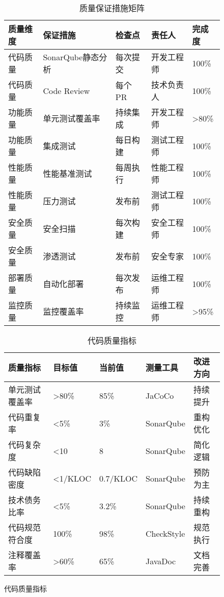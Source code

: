 \documentclass[a4paper,12pt]{article}
\begin{document}
\begin{figure}[H]
\begin{table}[H]
\centering
\caption{质量保证措施矩阵}
\begin{tabular}{|p{2.5cm}|p{3cm}|p{3cm}|p{2.5cm}|p{2cm}|}
\hline
\textbf{质量维度} & \textbf{保证措施} & \textbf{检查点} & \textbf{责任人} & \textbf{完成度} \\
\hline
代码质量 & SonarQube静态分析 & 每次提交 & 开发工程师 & 100\% \\
\hline
代码质量 & Code Review & 每个PR & 技术负责人 & 100\% \\
\hline
功能质量 & 单元测试覆盖率 & 持续集成 & 开发工程师 & >80\% \\
\hline
功能质量 & 集成测试 & 每日构建 & 测试工程师 & 100\% \\
\hline
性能质量 & 性能基准测试 & 每周执行 & 性能工程师 & 100\% \\
\hline
性能质量 & 压力测试 & 发布前 & 测试工程师 & 100\% \\
\hline
安全质量 & 安全扫描 & 每次构建 & 安全工程师 & 100\% \\
\hline
安全质量 & 渗透测试 & 发布前 & 安全专家 & 100\% \\
\hline
部署质量 & 自动化部署 & 每次发布 & 运维工程师 & 100\% \\
\hline
监控质量 & 监控覆盖率 & 持续监控 & 运维工程师 & >95\% \\
\hline
\end{tabular}
\end{table}

\begin{table}[H]
\centering
\caption{代码质量指标}
\begin{tabular}{|p{3cm}|p{2.5cm}|p{2.5cm}|p{2.5cm}|p{2.5cm}|}
\hline
\textbf{质量指标} & \textbf{目标值} & \textbf{当前值} & \textbf{测量工具} & \textbf{改进方向} \\
\hline
单元测试覆盖率 & >80\% & 85\% & JaCoCo & 持续提升 \\
\hline
代码重复率 & <5\% & 3\% & SonarQube & 重构优化 \\
\hline
代码复杂度 & <10 & 8 & SonarQube & 简化逻辑 \\
\hline
代码缺陷密度 & <1/KLOC & 0.7/KLOC & SonarQube & 预防为主 \\
\hline
技术债务比率 & <5\% & 3.2\% & SonarQube & 持续重构 \\
\hline
代码规范符合度 & 100\% & 98\% & CheckStyle & 规范执行 \\
\hline
注释覆盖率 & >60\% & 65\% & JavaDoc & 文档完善 \\
\hline
\end{tabular}
\end{table}


\end{figure}
\end{document}
